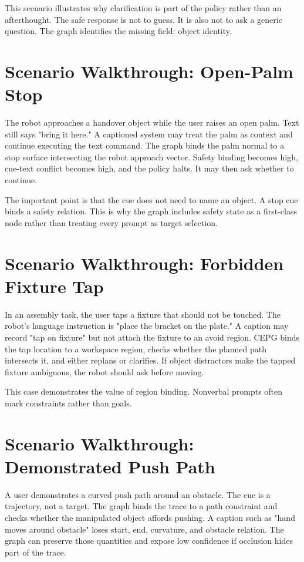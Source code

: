 \documentclass{article}
\newcommand{\method}{CEPG}
\begin{document}
This scenario illustrates why clarification is part of the policy rather than an afterthought. The safe response is not to guess. It is also not to ask a generic question. The graph identifies the missing field: object identity.

\section{Scenario Walkthrough: Open-Palm Stop}

The robot approaches a handover object while the user raises an open palm. Text still says "bring it here." A captioned system may treat the palm as context and continue executing the text command. The graph binds the palm normal to a stop surface intersecting the robot approach vector. Safety binding becomes high, cue-text conflict becomes high, and the policy halts. It may then ask whether to continue.

The important point is that the cue does not need to name an object. A stop cue binds a safety relation. This is why the graph includes safety state as a first-class node rather than treating every prompt as target selection.

\section{Scenario Walkthrough: Forbidden Fixture Tap}

In an assembly task, the user taps a fixture that should not be touched. The robot's language instruction is "place the bracket on the plate." A caption may record "tap on fixture" but not attach the fixture to an avoid region. \method{} binds the tap location to a workspace region, checks whether the planned path intersects it, and either replans or clarifies. If object distractors make the tapped fixture ambiguous, the robot should ask before moving.

This case demonstrates the value of region binding. Nonverbal prompts often mark constraints rather than goals.

\section{Scenario Walkthrough: Demonstrated Push Path}

A user demonstrates a curved push path around an obstacle. The cue is a trajectory, not a target. The graph binds the trace to a path constraint and checks whether the manipulated object affords pushing. A caption such as "hand moves around obstacle" loses start, end, curvature, and obstacle relation. The graph can preserve those quantities and expose low confidence if occlusion hides part of the trace.
\end{document}

